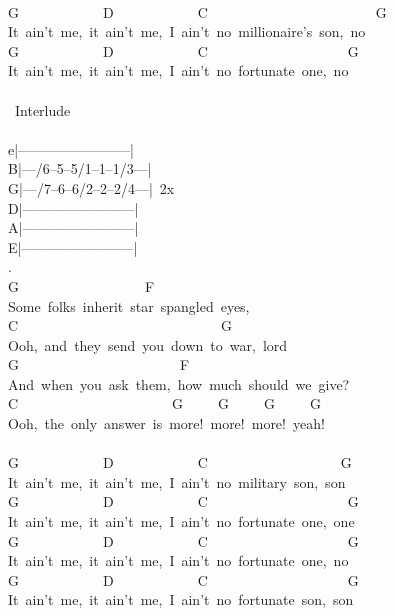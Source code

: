 {\\
G\ \ \ \ \ \ \ \ \ \ \ \ D\ \ \ \ \ \ \ \ \ \ \ \ C\ \ \ \ \ \ \ \ \ \ \ \ \ \ \ \ \ \ \ \ \ \ \ \ G\ \ \ \ \\
It\ ain't\ me,\ it\ ain't\ me,\ I\ ain't\ no\ millionaire's\ son,\ no\\
G\ \ \ \ \ \ \ \ \ \ \ \ D\ \ \ \ \ \ \ \ \ \ \ \ C\ \ \ \ \ \ \ \ \ \ \ \ \ \ \ \ \ \ \ \ G\\
It\ ain't\ me,\ it\ ain't\ me,\ I\ ain't\ no\ fortunate\ one,\ no\\
\\
\lbrack\ Interlude\rbrack\\
\\
e|------------------------|\\
B|---/6--5--5/1--1--1/3---|\\
G|---/7--6--6/2--2--2/4---|\ 2x\\
D|------------------------|\\
A|------------------------|\\
E|------------------------|\\
.
\\
G\ \ \ \ \ \ \ \ \ \ \ \ \ \ \ \ \ \ F\ \ \ \ \ \ \ \ \ \ \\
Some\ folks\ inherit\ star\ spangled\ eyes,\\
C\ \ \ \ \ \ \ \ \ \ \ \ \ \ \ \ \ \ \ \ \ \ \ \ \ \ \ \ \ G\ \ \ \ \ \ \ \ \ \ \ \ \ \ \\
Ooh,\ and\ they\ send\ you\ down\ to\ war,\ lord\\
G\ \ \ \ \ \ \ \ \ \ \ \ \ \ \ \ \ \ \ \ \ \ \ F\ \ \ \ \ \ \ \ \ \ \ \ \\
And\ when\ you\ ask\ them,\ \;how\ much\ should\ we\ give?\;\\
C\ \ \ \ \ \ \ \ \ \ \ \ \ \ \ \ \ \ \ \ \ \ G\ \ \ \ \ G\ \ \ \ \ G\ \ \ \ \ G\\
Ooh,\ the\ only\ answer\ is\ more!\ more!\ more!\ yeah!\\
\\
G\ \ \ \ \ \ \ \ \ \ \ \ D\ \ \ \ \ \ \ \ \ \ \ \ C\ \ \ \ \ \ \ \ \ \ \ \ \ \ \ \ \ \ \ G\\
It\ ain't\ me,\ it\ ain't\ me,\ I\ ain't\ no\ military\ son,\ son\\
G\ \ \ \ \ \ \ \ \ \ \ \ D\ \ \ \ \ \ \ \ \ \ \ \ C\ \ \ \ \ \ \ \ \ \ \ \ \ \ \ \ \ \ \ \ G\ \\
It\ ain't\ me,\ it\ ain't\ me,\ I\ ain't\ no\ fortunate\ one,\ one\\
G\ \ \ \ \ \ \ \ \ \ \ \ D\ \ \ \ \ \ \ \ \ \ \ \ C\ \ \ \ \ \ \ \ \ \ \ \ \ \ \ \ \ \ \ \ G\\
It\ ain't\ me,\ it\ ain't\ me,\ I\ ain't\ no\ fortunate\ one,\ no\\
G\ \ \ \ \ \ \ \ \ \ \ \ D\ \ \ \ \ \ \ \ \ \ \ \ C\ \ \ \ \ \ \ \ \ \ \ \ \ \ \ \ \ \ \ \ G\\
It\ ain't\ me,\ it\ ain't\ me,\ I\ ain't\ no\ fortunate\ son,\ son\\
}

